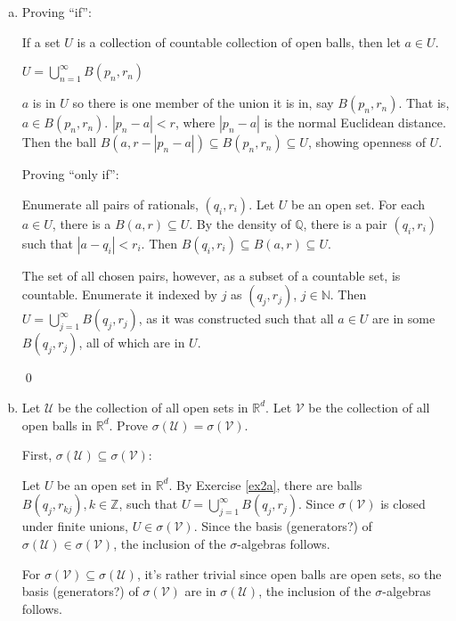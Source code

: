 \documentclass[11pt,oneside]{article}
\numberwithin{equation}{section}
\theoremstyle{definition}
\def\RR{\mathbb{R}}
\def\QQ{\mathbb{Q}}
\def\ZZ{\mathbb{Z}}
\def\NN{\mathbb{N}}
\def\fancyU{\mathscr{U}}
\def\fancyV{\mathscr{V}}
\begin{document}
\begin{solution}
  \begin{enumerate}[(a)]
  \item
    \label{ex2a}
    Proving ``if'':
    

    If a set $U$ is a collection of countable collection of open balls, then let
    $a \in U$.

    $U = \bigcup \limits _{n=1} ^ {\infty} B(p_n, r_n)$

    $a$ is in $U$ so there is one member of the union it is in, say
    $B(p_n, r_n)$.  That is, $ a \in B(p_n, r_n)$.  $|p_n - a| < r$,
    where $| p_n - a| $ is the normal Euclidean distance.  Then the
    ball $B(a, r - |p_n - a|) \subseteq B(p_n, r_n) \subseteq U$,
    showing openness of $U$.

    Proving ``only if'':

    Enumerate all pairs of rationals, $(q_i, r_i)$.  Let $U$ be an
    open set.  For each $a \in U$, there is a $B(a, r) \subseteq U$.
    By the density of $\QQ$, there is a pair $(q_i, r_i)$ such that
    $|a-q_i| < r_i$. Then $B(q_i, r_i) \subseteq B(a, r) \subseteq U$.  

    The set of all chosen pairs, however, as a subset of a countable
    set, is countable. Enumerate it indexed by $j$ as $(q_j, r_j)$,
    $j \in \NN$.  Then $U = \bigcup \limits _{j=1} ^ \infty B(q_j,
    r_j)$, as it was constructed such that all $a \in U$ are in some
    $B(q_j, r_j)$, all of which are in $U$.

    \qed
  \item
    Let $\fancyU$ be the collection of all open sets in $\RR^d$. Let
    $\fancyV$ be the collection of all open balls in $\RR^d$.  Prove
    $\sigma(\fancyU) = \sigma(\fancyV)$.

    First, $\sigma(\fancyU) \subseteq \sigma(\fancyV)$:

    Let $U$ be an open set in $\RR^d$.  By Exercise \ref{ex2a}, there
    are balls $B(q_j, r_{kj}), k \in \ZZ$, such
    that $U = \bigcup \limits _ {j=1}^\infty B(q_j, r_j)$.
    Since $\sigma(\fancyV)$ is
    closed under finite unions, $U \in \sigma(\fancyV)$.  Since the
    basis (generators?) of $\sigma(\fancyU) \in \sigma(\fancyV)$,
    the inclusion of the $\sigma$-algebras follows.

    For $\sigma(\fancyV) \subseteq \sigma(\fancyU)$, it's rather
    trivial since open balls are open sets, so the basis (generators?)
    of $\sigma(\fancyV)$ are in $\sigma(\fancyU)$, the inclusion of
    the $\sigma$-algebras follows.


\end{enumerate}
\end{solution}
\end{document}
